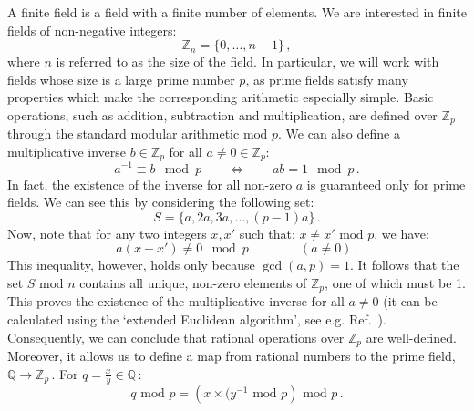 \documentclass[main.tex]{subfiles}
\begin{document}
A finite field is a field with a finite number of elements. We are interested in finite fields of non-negative integers:
\begin{equation} \label{eq:ffdefinition}
    \mathbb{Z}_n = \{0, \ldots, n-1\}\,,    
\end{equation}
where $n$ is referred to as the size of the field. In particular, we will work with fields whose size is a large prime number $p$, as prime fields satisfy many properties which make the corresponding arithmetic especially simple. Basic operations, such as addition, subtraction and multiplication, are defined over $\mathbb{Z}_p$ through the standard modular arithmetic $\text{mod } p$. We can also define a multiplicative inverse $b\in \mathbb{Z}_p$ for all $a\neq0 \in \mathbb{Z}_p$:
\begin{equation}
    a^{-1} \equiv b \mod p \qquad \Longleftrightarrow \qquad ab = 1 \mod p\,.
\end{equation}
In fact, the existence of the inverse for all non-zero $a$ is guaranteed only for prime fields. We can see this by considering the following set:
\begin{equation}
    S = \{a, 2a, 3a, \ldots, (p-1)a\}\,.
\end{equation}
Now, note that for any two integers $x, x'$ such that: $x \neq x' \text{ mod } p$, we have:
\begin{equation}
    a(x-x') \neq 0 \mod p \qquad \qquad (a \neq 0) \,.
\end{equation}
This inequality, however, holds only because $\gcd(a, p) = 1$. It follows that the set $S \text{ mod } n$ contains all unique, non-zero elements of $\mathbb{Z}_p$, one of which must be 1. This proves the existence of the multiplicative inverse for all $a \neq 0$ (it can be calculated using the `extended Euclidean algorithm', see e.g. Ref.~\cite{knuth2014art}). Consequently, we can conclude that rational operations over $\mathbb{Z}_p$ are well-defined. Moreover, it allows us to define a map from rational numbers to the prime field, $\mathbb{Q} \rightarrow \mathbb{Z}_p\,$. For $q=\frac{x}{y} \in \mathbb{Q}\,$: 
\begin{equation}
    q \text{ mod } p = \left(x \times (y^{-1} \text{ mod } p \right) \text{ mod } p\,.
\end{equation}
\end{document}
